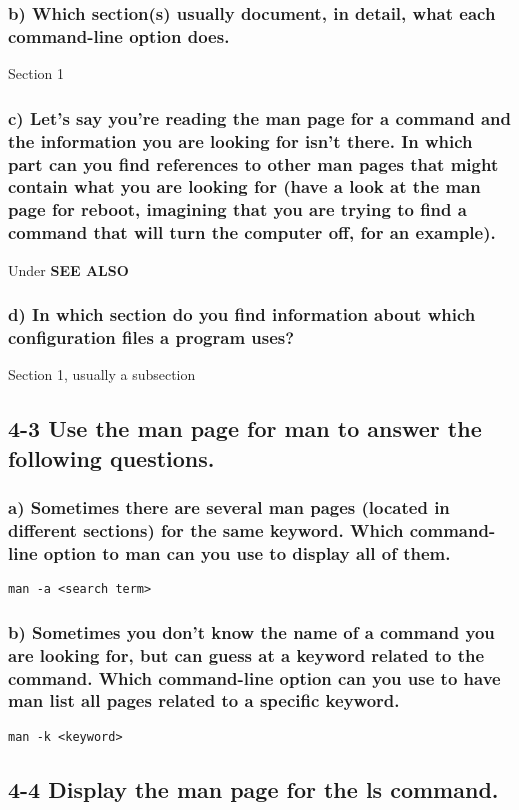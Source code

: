 \subsubsection{b) Which section(s) usually document, in detail, what each command-line option does.}
Section 1

\subsubsection{c) Let's say you're reading the man page for a command and the information you are looking for isn't there. In which part can you find references to other man pages that might contain what you are looking for (have a look at the man page for reboot, imagining that you are trying to find a command that will turn the computer off, for an example).}
Under \textbf{SEE ALSO}

\subsubsection{d) In which section do you find information about which configuration files a program uses?}
Section 1, usually a subsection


\subsection{4-3 Use the man page for man to answer the following questions.}

\subsubsection{a) Sometimes there are several man pages (located in different sections) for the same keyword. Which command-line option to man can you use to display all of them.}
\verb=man -a <search term>=

\subsubsection{b) Sometimes you don't know the name of a command you are looking for, but can guess at a keyword related to the command. Which command-line option can you use to have man list all pages related to a specific keyword.}
\verb=man -k <keyword>=

\subsection{4-4 Display the man page for the ls command.}
